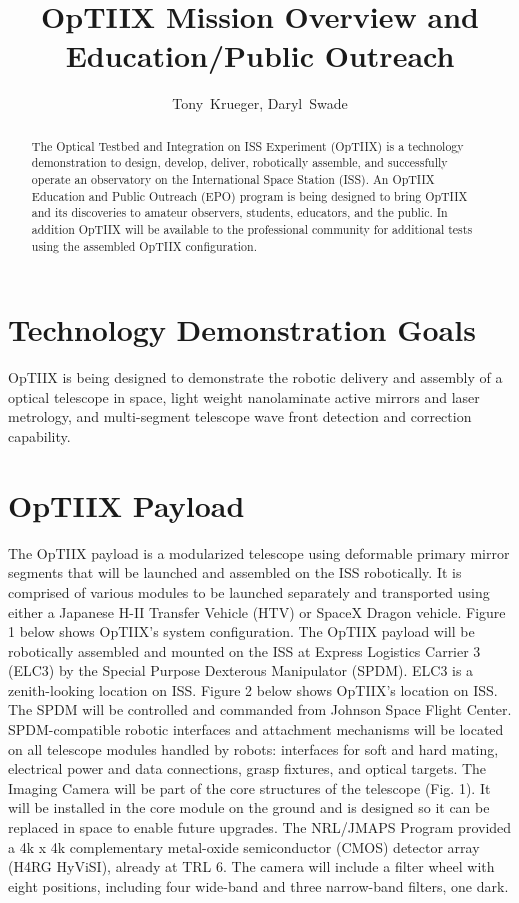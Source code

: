 \documentclass[11pt,twoside]{article}
\begin{document}
\title{OpTIIX Mission Overview and Education/Public Outreach}
\author{Tony~Krueger, Daryl~Swade
}

\begin{abstract}
The Optical Testbed and Integration on ISS Experiment (OpTIIX) is a technology demonstration to design, develop, deliver, robotically assemble, and successfully operate an observatory on the International Space Station (ISS).  An OpTIIX Education and Public Outreach (EPO) program is being designed to bring OpTIIX and its discoveries to amateur observers, students, educators, and the public.  In addition OpTIIX will be available to the professional community for additional tests using the assembled OpTIIX configuration. 
\end{abstract}

\section{Technology Demonstration Goals}
OpTIIX is being designed to demonstrate the robotic delivery and assembly of a optical telescope in space, light weight nanolaminate active mirrors and laser metrology, and multi-segment telescope wave front detection and correction capability.

\section{OpTIIX Payload}
The OpTIIX payload is a modularized telescope using deformable primary mirror segments that will be launched and assembled on the ISS robotically.  It is comprised of various modules to be launched separately and transported using either a Japanese H-II Transfer Vehicle (HTV) or SpaceX Dragon vehicle.  Figure 1 below shows OpTIIX’s system configuration.  The OpTIIX payload will be robotically assembled and mounted on the ISS at Express Logistics Carrier 3 (ELC3) by the Special Purpose Dexterous Manipulator (SPDM).  ELC3 is a zenith-looking location on ISS.  Figure 2 below shows OpTIIX’s location on ISS. The SPDM will be controlled and commanded from Johnson Space Flight Center. SPDM-compatible robotic interfaces and attachment mechanisms will be located on all telescope modules handled by robots: interfaces for soft and hard mating, electrical power and data connections, grasp fixtures, and optical targets.  The Imaging Camera will be part of the core structures of the telescope (Fig. 1). It will be installed in the core module on the ground and is designed so it can be replaced in space to enable future upgrades. The NRL/JMAPS Program provided a 4k x 4k complementary metal-oxide semiconductor (CMOS) detector array (H4RG HyViSI), already at TRL 6. The camera will include a filter wheel with eight positions, including four wide-band and three narrow-band filters, one dark.
\end{document}
